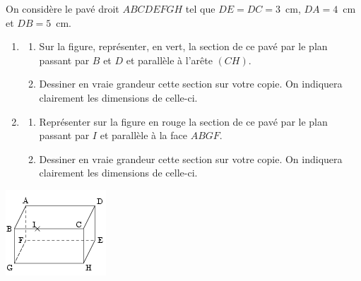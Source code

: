 
\begin{multicols}{2}
On considère le pavé droit $ABCDEFGH$ tel que $DE=DC=3$~cm, $DA=4$~cm et $DB=5$~cm.
\begin{enumerate}
	\item 
\begin{enumerate}
\item Sur la figure, représenter, en vert, la section de ce pavé par
  le plan passant par $B$ et $D$ et parallèle à l'arête $(CH)$.
	\item Dessiner en vraie grandeur cette section sur votre
          copie. On indiquera clairement les dimensions de celle-ci.
\end{enumerate}
	\item 
\begin{enumerate}
	\item Représenter sur la figure en rouge la section de ce pavé
          par le plan passant par $I$ et parallèle à la face $ABGF$.
	\item Dessiner en vraie grandeur cette section sur votre
          copie. On indiquera clairement les dimensions de celle-ci.
\end{enumerate}
\end{enumerate}
\begin{center}
\includegraphics[scale=1]{RepS-41.png} 
\end{center}
\end{multicols}

